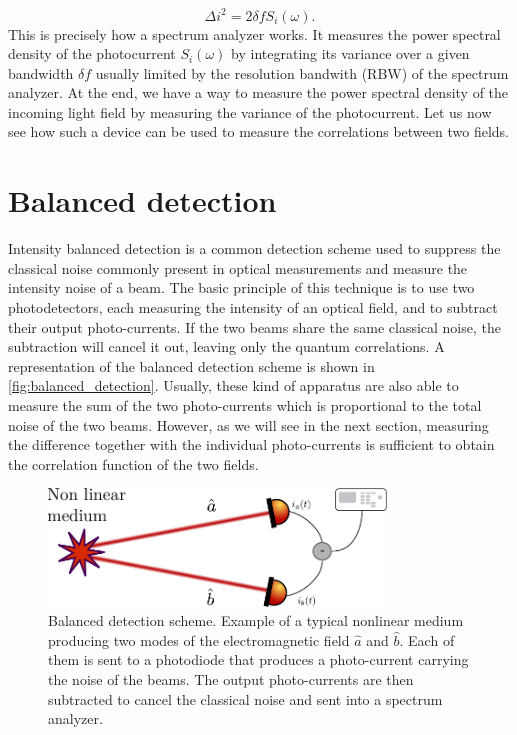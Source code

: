 \begin{equation}
    \label{eq:photocurrent_variance3}
    \Delta i^2 = 2\delta f S_i(\omega).
\end{equation}
This is precisely how a spectrum analyzer works. It measures the power spectral density of the photocurrent $S_i(\omega)$ by integrating its variance over a given bandwidth $\delta f$ usually limited by the resolution 
bandwith (RBW) of the spectrum analyzer.
At the end, we have a way to measure the power spectral density of the incoming light field by measuring the variance of the photocurrent. 
Let us now see how such a device can be used to measure the correlations between two fields.

\section{Balanced detection}
Intensity balanced detection is a common detection scheme used to suppress the classical noise commonly present in optical measurements and measure the intensity noise of a beam.
The basic principle of this technique is to use two photodetectors, each measuring the intensity of an optical field, and to subtract their output photo-currents. If the two 
beams share the same classical noise, the subtraction will cancel it out, leaving only the quantum correlations. A representation of the balanced detection scheme is shown in \autoref{fig:balanced_detection}.
Usually, these kind of apparatus are also able to measure the sum of the two photo-currents which is proportional to the total noise of the two beams. However,
as we will see in the next section, measuring the difference together with the individual photo-currents is sufficient to obtain the correlation function of the two fields.
\begin{figure}
    \centering
    \includegraphics[width=0.8\textwidth]{chap_correlation/fig/balanced_detection.pdf}
    \caption{Balanced detection scheme. Example of a typical nonlinear medium producing two modes of the electromagnetic field $\hat{a}$ and $\hat{b}$. Each of them is sent to a photodiode that produces a photo-current carrying the noise
    of the beams. The output photo-currents are then subtracted to cancel the classical noise and sent into a spectrum analyzer.}
    \label{fig:balanced_detection}
\end{figure} 

